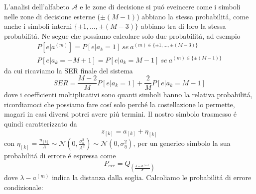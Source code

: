             L'analisi dell'alfabeto $\mathcal{A}$ e le zone di decisione si puó eveincere come i simboli 
            nelle zone di decisione esterne ($\pm(M-1)$) abbiano la stessa probabilitá, come anche i 
            simboli interni $\{\pm 1,\dots,\pm (M-3)\}$ abbiano tra di loro la stessa probabilitá. Ne segue che 
            possiamo calcolare solo due probabilitá, ad esempio
            \begin{gather}
                P[e|a^{(m)}] = P[e|a_k = 1]\ se\ a^{(m)\in\{\pm 1,\dots,\pm (M-3)\}}\nonumber \\
                P[e|a_k =-M+1] = P[e|a_k = M-1]\ se\ a^{(m)\in\{\pm (M-1)\}}\nonumber
            \end{gather}
            da cui ricaviamo la SER finale del sistema
            \[
                SER =  \frac{M-2}{M}P[e|a_k = 1]+ \frac{2}{M}P[e|a_k = M-1]
            \]
            dove i coefficienti moltiplicativi sono quanti simboli hanno la relativa probabilitá, ricordiamoci
            che possiamo fare cosí solo perché la costellazione lo permette, magari in casi diversi potrei
            avere piú termini. Il nostro simbolo trasmesso é quindi caratterizzato da
            \[
                z_{[k]} = a_{[k]} + \eta_{[k]}
            \]
            con $\eta_{[k]} = \frac{n_{[k]}}{A} \sim \mathcal{N}(0,\frac{\sigma_n^2}{A^2})\sim \mathcal{N}(0,\sigma_\eta^2)$,
            per un generico simbolo la sua probabilitá di errore é espressa come 
            \[
                P_{err} = Q_{\displaystyle\left(\frac{\lambda - a^{(m)}}{\sigma}\right)}    
            \]
            dove $\lambda - a^{(m)}$ indica la distanza dalla soglia.
            Calcoliamo le probabilitá di errore condizionale:
